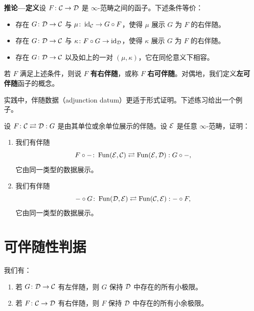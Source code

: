 
\nitem\label{L12-1.11} \textbf{推论—定义}\quad 设 $F\colon\mathcal{C}\to\mathcal{D}$ 是 $\infty$-范畴之间的函子。下述条件等价：
\begin{itemize}[leftmargin=2.2em,itemsep=0.1em]
\item 存在 $G\colon\mathcal{D}\to\mathcal{C}$ 与 $\mu\colon\operatorname{id}_{\mathcal{C}}\to G\circ F$，使得 $\mu$ 展示 $G$ 为 $F$ 的右伴随。
\item 存在 $G\colon\mathcal{D}\to\mathcal{C}$ 与 $\kappa\colon F\circ G\to\operatorname{id}_{\mathcal{D}}$，使得 $\kappa$ 展示 $G$ 为 $F$ 的右伴随。
\item 存在 $G\colon\mathcal{D}\to\mathcal{C}$ 以及如上的一对 $(\mu,\kappa)$，它在同伦意义下相容。
\end{itemize}
若 $F$ 满足上述条件，则说 $F$ \textbf{有右伴随}，或称 $F$ \textbf{右可伴随}。对偶地，我们定义\textbf{左可伴随}函子的概念。

\nitem\label{L12-1.12} 实践中，伴随数据（adjunction datum）更适于形式证明。下述练习给出一个例子。

\begin{exercise}\label{L12-1.13}
设 $F\colon\mathcal{C}\rightleftarrows\mathcal{D}:G$ 是由其单位或余单位展示的伴随。设 $\mathcal{E}$ 是任意 $\infty$-范畴，证明：
\begin{enumerate}[label=(\arabic*),leftmargin=2.4em,itemsep=0.2em]
\item 我们有伴随
\[
F\circ-\colon\operatorname{Fun}(\mathcal{E},\mathcal{C})\rightleftarrows\operatorname{Fun}(\mathcal{E},\mathcal{D}):G\circ-,
\]
它由同一类型的数据展示。
\item 我们有伴随
\[
-\circ G\colon\operatorname{Fun}(\mathcal{D},\mathcal{E})\rightleftarrows\operatorname{Fun}(\mathcal{C},\mathcal{E}):-\circ F,
\]
它由同一类型的数据展示。
\end{enumerate}
\end{exercise}

\section{可伴随性判据}

\begin{proposition}\label{L12-2.1}
我们有：
\begin{enumerate}[label=(\arabic*),leftmargin=2.4em,itemsep=0.2em]
\item 若 $G\colon\mathcal{D}\to\mathcal{C}$ 有左伴随，则 $G$ 保持 $\mathcal{D}$ 中存在的所有小极限。
\item 若 $F\colon\mathcal{C}\to\mathcal{D}$ 有右伴随，则 $F$ 保持 $\mathcal{D}$ 中存在的所有小余极限。
\end{enumerate}
\end{proposition}

